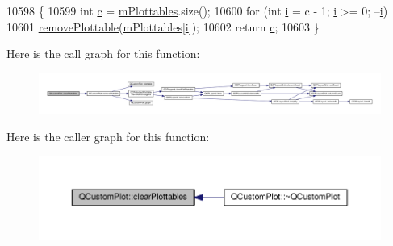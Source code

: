 \begin{DoxyCode}
10598                                  \{
10599   \textcolor{keywordtype}{int} \hyperlink{_comparision_pictures_2_createtest_image_8m_ae0323a9039add2978bf5b49550572c7c}{c} = \hyperlink{class_q_custom_plot_a4b6c694fbdb2f201626f71eff2d1694e}{mPlottables}.size();
10600   \textcolor{keywordflow}{for} (\textcolor{keywordtype}{int} \hyperlink{_comparision_pictures_2_createtest_image_8m_a6f6ccfcf58b31cb6412107d9d5281426}{i} = c - 1; \hyperlink{_comparision_pictures_2_createtest_image_8m_a6f6ccfcf58b31cb6412107d9d5281426}{i} >= 0; --\hyperlink{_comparision_pictures_2_createtest_image_8m_a6f6ccfcf58b31cb6412107d9d5281426}{i})
10601     \hyperlink{class_q_custom_plot_af3dafd56884208474f311d6226513ab2}{removePlottable}(\hyperlink{class_q_custom_plot_a4b6c694fbdb2f201626f71eff2d1694e}{mPlottables}[\hyperlink{_comparision_pictures_2_createtest_image_8m_a6f6ccfcf58b31cb6412107d9d5281426}{i}]);
10602   \textcolor{keywordflow}{return} \hyperlink{_comparision_pictures_2_createtest_image_8m_ae0323a9039add2978bf5b49550572c7c}{c};
10603 \}
\end{DoxyCode}


Here is the call graph for this function\+:\nopagebreak
\begin{figure}[H]
\begin{center}
\leavevmode
\includegraphics[width=350pt]{class_q_custom_plot_a9a409bb3201878adb7ffba1c89c4e004_cgraph}
\end{center}
\end{figure}




Here is the caller graph for this function\+:\nopagebreak
\begin{figure}[H]
\begin{center}
\leavevmode
\includegraphics[width=350pt]{class_q_custom_plot_a9a409bb3201878adb7ffba1c89c4e004_icgraph}
\end{center}
\end{figure}


